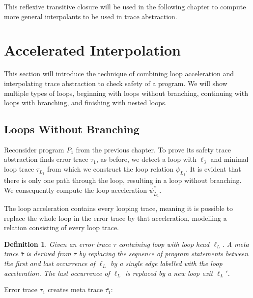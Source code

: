 \documentclass{article}
\newtheorem{mydef}{Definition}
\begin{document}
This reflexive transitive closure will be used in the following chapter to compute more general interpolants to be used in trace abstraction.

\section{Accelerated Interpolation}
This section will introduce the technique of combining loop acceleration and interpolating trace abstraction to check safety of a program. We will show multiple types of loops, beginning with loops without branching, continuing with loops with branching, and finishing with nested loops. \\

\subsection{Loops Without Branching}

Reconsider program $P_1$ from the previous chapter. To prove its safety trace abstraction finds error trace $\tau_1$, as before, we detect a loop with  $\ell_3$ and minimal loop trace $\tau_{L_1}$ from which we construct the loop relation $\psi_{L_1}$. It is evident that there is only one path through the loop, resulting in a loop without branching. We consequently compute the loop acceleration $\psi^*_{L_1}$. \par

The loop acceleration contains every looping trace, meaning it is possible to replace the whole loop in the error trace by that acceleration, modelling a relation consisting of every loop trace.

\begin{mydef}
	Given an error trace $\tau$ containing loop with loop head $\ell_L$. A meta trace $\bar{\tau}$ is derived from $\tau$ by replacing the sequence of program statements between the first and last occurrence of $\ell_L$ by a single edge labelled with the loop acceleration. The last occurrence of $\ell_L$ is replaced by a new loop exit $\ell_L'$.
\end{mydef}

Error trace $\tau_1$ creates meta trace $\bar{\tau_1}$:
\end{document}
